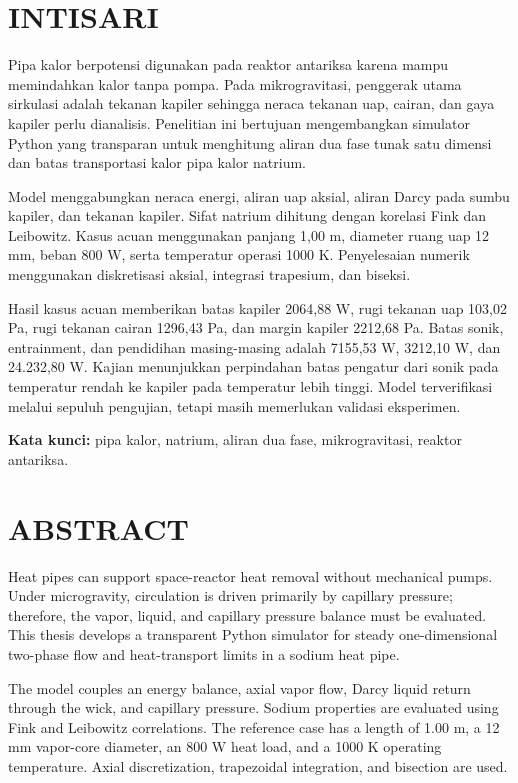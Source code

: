 \documentclass[
  12pt,
  12pt,a4paper,oneside]{report}
\begin{document}
\hypertarget{intisari}{%
\chapter*{INTISARI}\label{intisari}}

Pipa kalor berpotensi digunakan pada reaktor antariksa karena mampu
memindahkan kalor tanpa pompa. Pada mikrogravitasi, penggerak utama
sirkulasi adalah tekanan kapiler sehingga neraca tekanan uap, cairan,
dan gaya kapiler perlu dianalisis. Penelitian ini bertujuan
mengembangkan simulator Python yang transparan untuk menghitung aliran
dua fase tunak satu dimensi dan batas transportasi kalor pipa kalor
natrium.

Model menggabungkan neraca energi, aliran uap aksial, aliran Darcy pada
sumbu kapiler, dan tekanan kapiler. Sifat natrium dihitung dengan
korelasi Fink dan Leibowitz. Kasus acuan menggunakan panjang 1,00 m,
diameter ruang uap 12 mm, beban 800 W, serta temperatur operasi 1000 K.
Penyelesaian numerik menggunakan diskretisasi aksial, integrasi
trapesium, dan biseksi.

Hasil kasus acuan memberikan batas kapiler 2064,88 W, rugi tekanan uap
103,02 Pa, rugi tekanan cairan 1296,43 Pa, dan margin kapiler 2212,68
Pa. Batas sonik, entrainment, dan pendidihan masing-masing adalah
7155,53 W, 3212,10 W, dan 24.232,80 W. Kajian menunjukkan perpindahan
batas pengatur dari sonik pada temperatur rendah ke kapiler pada
temperatur lebih tinggi. Model terverifikasi melalui sepuluh pengujian,
tetapi masih memerlukan validasi eksperimen.

\textbf{Kata kunci:} pipa kalor, natrium, aliran dua fase,
mikrogravitasi, reaktor antariksa.

\hypertarget{abstract}{%
\chapter*{ABSTRACT}\label{abstract}}

Heat pipes can support space-reactor heat removal without mechanical
pumps. Under microgravity, circulation is driven primarily by capillary
pressure; therefore, the vapor, liquid, and capillary pressure balance
must be evaluated. This thesis develops a transparent Python simulator
for steady one-dimensional two-phase flow and heat-transport limits in a
sodium heat pipe.

The model couples an energy balance, axial vapor flow, Darcy liquid
return through the wick, and capillary pressure. Sodium properties are
evaluated using Fink and Leibowitz correlations. The reference case has
a length of 1.00 m, a 12 mm vapor-core diameter, an 800 W heat load, and
a 1000 K operating temperature. Axial discretization, trapezoidal
integration, and bisection are used.
\end{document}
